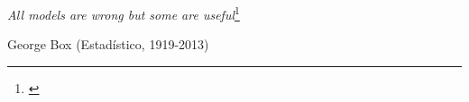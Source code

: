 \documentclass[
11pt, %
spanish, %
onehalfspacing, %
]{MastersDoctoralThesis_custom} %
\begin{document}

%
%
% 
% 
%
\cleardoublepage


\vspace*{0.05\textheight}

\hfill\textit{\large All models are wrong but some are useful}\footnote{\cite{box1979robustness}}\bigbreak

\hfill George Box (Estadístico, 1919-2013)
\end{document}
